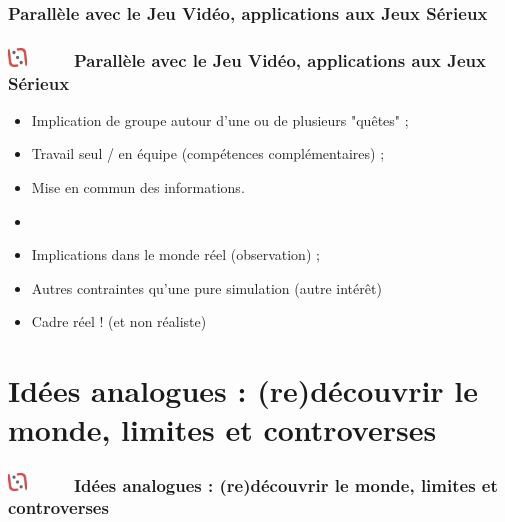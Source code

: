 \documentclass[slidetop,11pt]{beamer}
\def\moreInFrameTitleLeftt{\includegraphics[height=0.5cm]{img/ligueludique-0.png}~~~~~}
\begin{document}
\def\sectionPartIIcIII{Parall{\`e}le avec le Jeu Vid{\'e}o, \newline applications aux Jeux S{\'e}rieux}
\subsubsection{\sectionPartIIcIII} %
\begin{frame}
	\frametitle{\moreInFrameTitleLeftt \sectionPartIIcIII }
	\begin{itemize}
		\item Implication de groupe autour d'une ou de plusieurs "qu{\^e}tes" ; 
		\item Travail seul / en {\'e}quipe (comp{\'e}tences compl{\'e}mentaires) ; 
		\item Mise en commun des informations. 
		\item []
		\item Implications dans le monde r{\'e}el (observation) ; 
		\item Autres contraintes qu'une pure simulation (autre int{\'e}r{\^e}t)
		\item Cadre r{\'e}el ! (et non r{\'e}aliste)
	\end{itemize}
\end{frame} 


\def\sectionPartIII{Id{\'e}es analogues : (re)d{\'e}couvrir le monde, limites et controverses}
\section{\sectionPartIII}
\begin{frame}
	\frametitle{\moreInFrameTitleLeftt \sectionPartIII}
	\tableofcontents[sections=3,currentsection,subsectionstyle=show/shaded/hide] %
\end{frame} 

\end{document}
